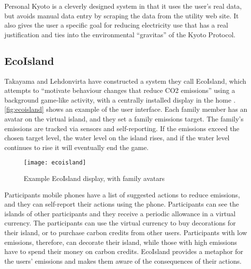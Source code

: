 Personal Kyoto is a cleverly designed system in that it uses the user's real data, but avoids manual data entry by scraping the data from the utility web site. It also gives the user a specific goal for reducing electricity use that has a real justification and ties into the environmental ``gravitas'' of the Kyoto Protocol.

\subsection{EcoIsland}
\label{sec:ecoisland}

Takayama and Lehdonvirta have constructed a system they call EcoIsland, which attempts to ``motivate behaviour changes that reduce CO2 emissions'' using a background game-like activity, with a centrally installed display in the home \cite{takayama-2008}. \autoref{fig:ecoisland} shows an example of the user interface. Each family member has an avatar on the virtual island, and they set a family \COtwo emissions target. The family's emissions are tracked via sensors and self-reporting. If the emissions exceed the chosen target level, the water level on the island rises, and if the water level continues to rise it will eventually end the game.

\begin{figure}[htb]
	\centering
		\texttt{[image: ecoisland]}
		\caption{Example EcoIsland display, with family avatars}
		\label{fig:ecoisland}
\end{figure}

Participants mobile phones have a list of suggested actions to reduce emissions, and they can self-report their actions using the phone. Participants can see the islands of other participants and they receive a periodic allowance in a virtual currency. The participants can use the virtual currency to buy decorations for their island, or to purchase carbon credits from other users. Participants with low emissions, therefore, can decorate their island, while those with high emissions have to spend their money on carbon credits. EcoIsland provides a metaphor for the users' emissions and makes them aware of the consequences of their actions.

